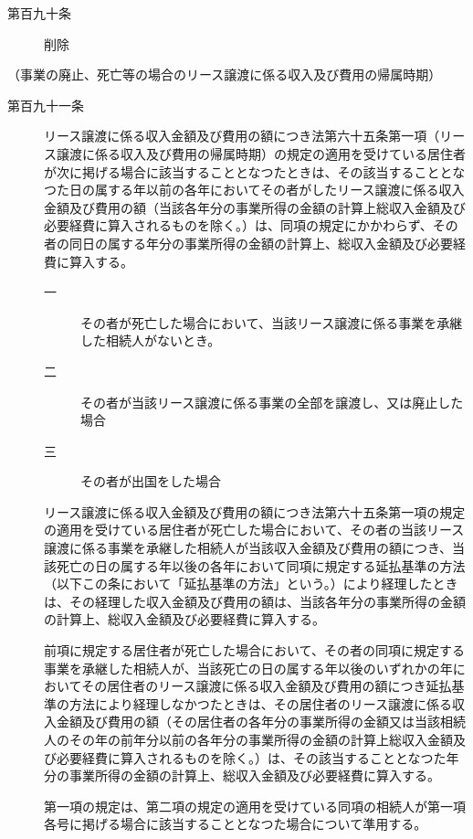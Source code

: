 \documentclass[twocolumn,a4j,10pt]{ltjtarticle}
\begin{document}
\begin{description}
\item[第百九十条]削除
\end{description}
\noindent\hspace{10pt}（事業の廃止、死亡等の場合のリース譲渡に係る収入及び費用の帰属時期）
\begin{description}
\item[第百九十一条]リース譲渡に係る収入金額及び費用の額につき法第六十五条第一項（リース譲渡に係る収入及び費用の帰属時期）の規定の適用を受けている居住者が次に掲げる場合に該当することとなつたときは、その該当することとなつた日の属する年以前の各年においてその者がしたリース譲渡に係る収入金額及び費用の額（当該各年分の事業所得の金額の計算上総収入金額及び必要経費に算入されるものを除く。）は、同項の規定にかかわらず、その者の同日の属する年分の事業所得の金額の計算上、総収入金額及び必要経費に算入する。
\begin{description}
\item[一]その者が死亡した場合において、当該リース譲渡に係る事業を承継した相続人がないとき。
\item[二]その者が当該リース譲渡に係る事業の全部を譲渡し、又は廃止した場合
\item[三]その者が出国をした場合
\end{description}
\item[]リース譲渡に係る収入金額及び費用の額につき法第六十五条第一項の規定の適用を受けている居住者が死亡した場合において、その者の当該リース譲渡に係る事業を承継した相続人が当該収入金額及び費用の額につき、当該死亡の日の属する年以後の各年において同項に規定する延払基準の方法（以下この条において「延払基準の方法」という。）により経理したときは、その経理した収入金額及び費用の額は、当該各年分の事業所得の金額の計算上、総収入金額及び必要経費に算入する。
\item[]前項に規定する居住者が死亡した場合において、その者の同項に規定する事業を承継した相続人が、当該死亡の日の属する年以後のいずれかの年においてその居住者のリース譲渡に係る収入金額及び費用の額につき延払基準の方法により経理しなかつたときは、その居住者のリース譲渡に係る収入金額及び費用の額（その居住者の各年分の事業所得の金額又は当該相続人のその年の前年分以前の各年分の事業所得の金額の計算上総収入金額及び必要経費に算入されるものを除く。）は、その該当することとなつた年分の事業所得の金額の計算上、総収入金額及び必要経費に算入する。
\item[]第一項の規定は、第二項の規定の適用を受けている同項の相続人が第一項各号に掲げる場合に該当することとなつた場合について準用する。

\end{description}
\end{document}
